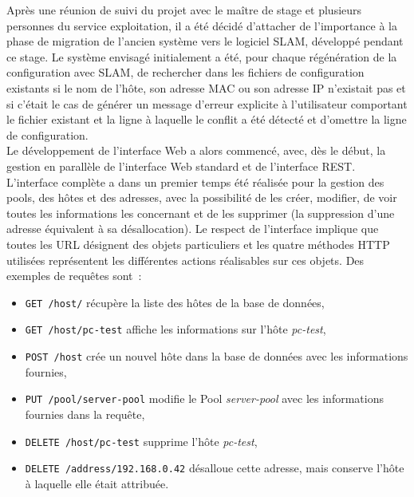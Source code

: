 \documentclass[12pt,a4paper,twoside]{report}
\begin{document}
Après une réunion de suivi du projet avec le maître de stage et plusieurs
personnes du service exploitation, il a été décidé d’attacher de l’importance à
la phase de migration de l’ancien système vers le logiciel SLAM, développé
pendant ce stage. Le système envisagé initialement a été, pour chaque
régénération de la configuration avec SLAM, de rechercher dans les fichiers de
configuration existants si le nom de l’hôte, son adresse MAC ou son adresse IP
n’existait pas et si c’était le cas de générer un message d’erreur explicite à
l’utilisateur comportant le fichier existant et la ligne à laquelle le conflit
a été détecté et d’omettre la ligne de configuration.\\

Le développement de l’interface Web a alors commencé, avec, dès le début, la
gestion en parallèle de l’interface Web standard et de l’interface REST.
L’interface complète a dans un premier temps été réalisée pour la gestion des
pools, des hôtes et des adresses, avec la possibilité de les créer, modifier,
de voir toutes les informations les concernant et de les supprimer (la
suppression d’une adresse équivalent à sa désallocation). Le respect de
l’interface implique que toutes les URL désignent des objets particuliers et
les quatre méthodes HTTP utilisées représentent les différentes actions
réalisables sur ces objets. Des exemples de requêtes sont~:

\begin{itemize}
	\item \verb+GET /host/+ récupère la liste des hôtes de la base de données,
	\item \verb+GET /host/pc-test+ affiche les informations sur l’hôte
	\emph{pc-test},
	\item \verb+POST /host+ crée un nouvel hôte dans la base de données avec
	les informations fournies,
	\item \verb+PUT /pool/server-pool+ modifie le Pool \emph{server-pool} avec
	les informations fournies dans la requête,
	\item \verb+DELETE /host/pc-test+ supprime l’hôte \emph{pc-test},
	\item \verb+DELETE /address/192.168.0.42+ désalloue cette adresse, mais
	conserve l’hôte à laquelle elle était attribuée.
\end{itemize}
\end{document}
